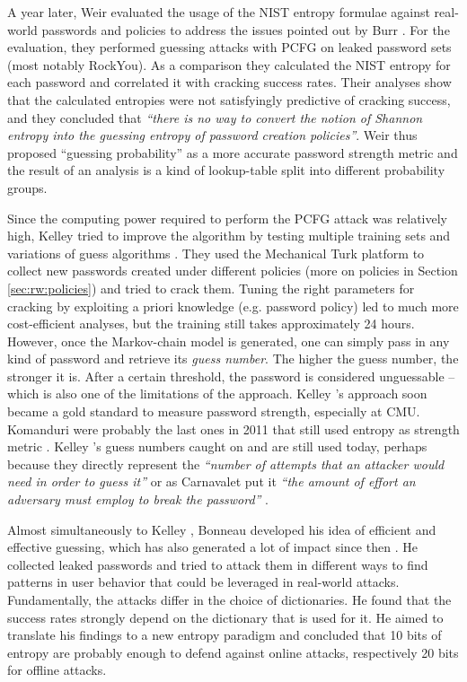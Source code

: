 	A year later, Weir \etal evaluated the usage of the \gls{NIST} entropy formulae against real-world passwords and policies \cite{Weir2010MetricsPolicies} to address the issues pointed out by Burr \etal. For the evaluation, they performed guessing attacks with PCFG on leaked password sets (most notably RockYou). As a comparison they calculated the NIST entropy for each password and correlated it with cracking success rates. Their analyses show that the calculated entropies were not satisfyingly predictive of cracking success, and they concluded that \textit{``there is no way to convert the notion of Shannon entropy into the guessing entropy of password creation
	policies''}. Weir \etal thus proposed ``guessing probability'' as a more accurate password strength metric and the result of an analysis is a kind of lookup-table split into different probability groups. 

	Since the computing power required to perform the PCFG attack was relatively high, Kelley \etal tried to improve the algorithm by testing multiple training sets and variations of guess algorithms \cite{Kelley2012GuessAgain}. They used the Mechanical Turk platform to collect new passwords created under different policies (more on policies in Section \ref{sec:rw:policies}) and tried to crack them. Tuning the right parameters for cracking by exploiting a priori knowledge (e.g. password policy) led to much more cost-efficient analyses, but the training still takes approximately 24 hours. However, once the Markov-chain model is generated, one can simply pass in any kind of password and retrieve its \textit{guess number}. The higher the guess number, the stronger it is. After a certain threshold, the password is considered unguessable -- which is also one of the limitations of the approach. Kelley \etal's approach soon became a gold standard to measure password strength, especially at CMU. Komanduri \etal were probably the last ones in 2011 that still used entropy as strength metric \cite{Komanduri2011OfPasswordsAndPeople}. Kelley \etal's guess numbers caught on and are still used today, perhaps because they directly represent the \textit{``number of attempts that an attacker would need in order to guess it''} \cite{Dellamico2015MonteCarlo} or as Carnavalet put it \textit{``the amount of effort an adversary must employ to break the password''} \cite{Carnavalet2014AnalyzingPWStrengthMeters}.
	
	Almost simultaneously to Kelley \etal, Bonneau developed his idea of efficient and effective guessing, which has also generated a lot of impact since then \cite{Bonneau2012ScienceOfGuessing}. He collected leaked passwords and tried to attack them in different ways to find patterns in user behavior that could be leveraged in real-world attacks. Fundamentally, the attacks differ in the choice of dictionaries. He found that the success rates strongly depend on the dictionary that is used for it. He aimed to translate his findings to a new entropy paradigm and concluded that 10 bits of entropy are probably enough to defend against online attacks, respectively 20 bits for offline attacks. 
	
